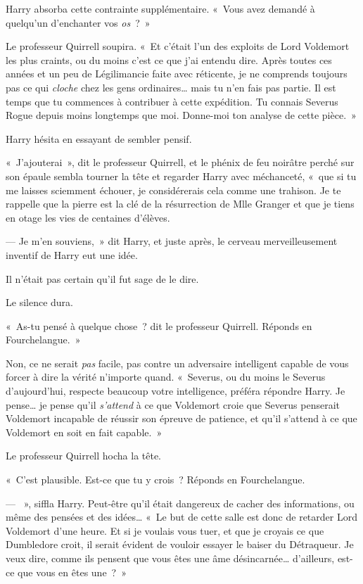 Harry absorba cette contrainte supplémentaire.
«~Vous avez demandé à quelqu'un d'enchanter vos \emph{os}~?~»

Le professeur Quirrell soupira.
«~Et c'était l'un des exploits de Lord Voldemort les plus craints, ou du moins c'est ce que j'ai entendu dire.
Après toutes ces années et un peu de Légilimancie faite avec réticente, je ne comprends toujours pas ce qui \emph{cloche} chez les gens ordinaires… mais tu n'en fais pas partie.
Il est temps que tu commences à contribuer à cette expédition.
Tu connais Severus Rogue depuis moins longtemps que moi.
Donne-moi ton analyse de cette pièce.~»

Harry hésita en essayant de sembler pensif.

«~J'ajouterai~», dit le professeur Quirrell, et le phénix de feu noirâtre perché sur son épaule sembla tourner la tête et regarder Harry avec méchanceté, «~que si tu me laisses sciemment échouer, je considérerais cela comme une trahison.
Je te rappelle que la pierre est la clé de la résurrection de Mlle Granger et que je tiens en otage les vies de centaines d'élèves.

--- Je m'en souviens,~» dit Harry, et juste après, le cerveau merveilleusement inventif de Harry eut une idée.

Il n'était pas certain qu'il fut sage de le dire.

Le silence dura.

«~As-tu pensé à quelque chose~? dit le professeur Quirrell.
Réponds en Fourchelangue.~»

Non, ce ne serait \emph{pas} facile, pas contre un adversaire intelligent capable de vous forcer à dire la vérité n'importe quand.
«~Severus, ou du moins le Severus d'aujourd'hui, respecte beaucoup votre intelligence, préféra répondre Harry.
Je pense… je pense qu'il \emph{s'attend} à ce que Voldemort croie que Severus penserait Voldemort incapable de réussir son épreuve de patience, et qu'il s'attend à ce que Voldemort en soit en fait capable.~»

Le professeur Quirrell hocha la tête.

«~C'est plausible.
Est-ce que tu y crois~?
Réponds en Fourchelangue.

--- ~», siffla Harry.
Peut-être qu'il était dangereux de cacher des informations, ou même des pensées et des idées…
«~Le but de cette salle est donc de retarder Lord Voldemort d'une heure.
Et si je voulais vous tuer, et que je croyais ce que Dumbledore croit, il serait évident de vouloir essayer le baiser du Détraqueur.
Je veux dire, comme ils pensent que vous êtes une âme désincarnée… d'ailleurs, est-ce que vous en êtes une~?~»

